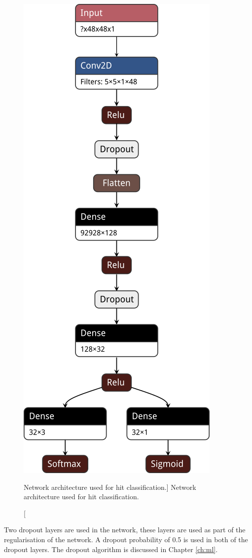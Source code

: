 \begin{figure}
	\centering
	\includegraphics[height=0.7\textheight]{figures/track_shower_arch.png}
	\caption
	[Network architecture used for hit classification.]
	{Network architecture used for hit classification.}
	\label{fig:arch}
\end{figure}

Two dropout layers are used in the network, these layers are used as part of the
regularisation of the network. A dropout probability of 0.5 is used in both of
the dropout layers. The dropout algorithm is discussed in Chapter \ref{ch:ml}.


